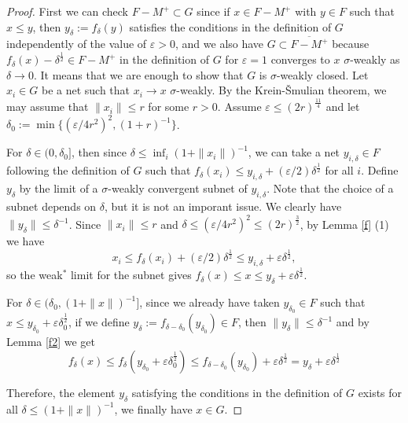 \documentclass[noamsfonts,a4paper,10pt]{amsart}
\theoremstyle{plain}
\theoremstyle{definition}
\theoremstyle{remark}
\begin{document}
\begin{proof}
First we can check $F-M^+\subset G$ since if $x\in F-M^+$ with $y\in F$ such that $x\le y$, then $y_\delta:=f_\delta(y)$ satisfies the conditions in the definition of $G$ independently of the value of $\varepsilon>0$, and we also have $G\subset\overline{F-M^+}$ because $f_\delta(x)-\delta^{\frac12}\in F-M^+$ in the definition of $G$ for $\varepsilon=1$ converges to $x$ $\sigma$-weakly as $\delta\to0$.
It means that we are enough to show that $G$ is $\sigma$-weakly closed.
Let $x_i\in G$ be a net such that $x_i\to x$ $\sigma$-weakly.
By the Krein-\v Smulian theorem, we may assume that $\|x_i\|\le r$ for some $r>0$.
Assume $\varepsilon\le(2r)^{\frac{11}4}$ and let $\delta_0:=\min\{(\varepsilon/4r^2)^2,(1+r)^{-1}\}$.

For $\delta\in(0,\delta_0]$, then since $\delta\le\inf_i(1+\|x_i\|)^{-1}$, we can take a net $y_{i,\delta}\in F$ following the definition of $G$ such that $f_\delta(x_i)\le y_{i,\delta}+(\varepsilon/2)\delta^{\frac12}$ for all $i$.
Define $y_\delta$ by the limit of a $\sigma$-weakly convergent subnet of $y_{i,\delta}$.
Note that the choice of a subnet depends on $\delta$, but it is not an imporant issue.
We clearly have $\|y_\delta\|\le\delta^{-1}$.
Since $\|x_i\|\le r$ and $\delta\le(\varepsilon/4r^2)^2\le(2r)^{\frac32}$, by Lemma \ref{f} (1) we have
\[x_i\le f_\delta(x_i)+(\varepsilon/2)\delta^{\frac12}\le y_{i,\delta}+\varepsilon\delta^{\frac12},\]
so the weak$^*$ limit for the subnet gives $f_\delta(x)\le x\le y_\delta+\varepsilon\delta^{\frac12}$.

For $\delta\in(\delta_0,(1+\|x\|)^{-1}]$, since we already have taken $y_{\delta_0}\in F$ such that $x\le y_{\delta_0}+\varepsilon\delta_0^{\frac12}$, if we define $y_\delta:=f_{\delta-\delta_0}(y_{\delta_0})\in F$, then $\|y_\delta\|\le\delta^{-1}$ and by Lemma \ref{f2} we get
\[f_{\delta}(x)\le f_\delta(y_{\delta_0}+\varepsilon\delta_0^{\frac12})\le f_{\delta-\delta_0}(y_{\delta_0})+\varepsilon\delta^{\frac12}=y_\delta+\varepsilon\delta^{\frac12}\]

Therefore, the element $y_\delta$ satisfying the conditions in the definition of $G$ exists for all $\delta\le(1+\|x\|)^{-1}$, we finally have $x\in G$.
\end{proof}
\end{document}

